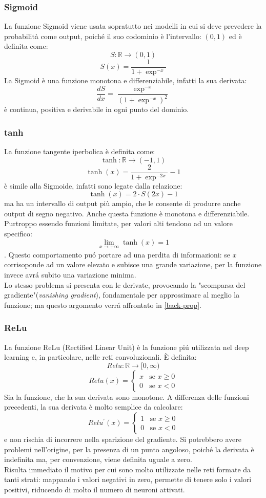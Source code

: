 \documentclass[a4paper,12pt]{report}
\begin{document}
\subsubsection{Sigmoid}
La funzione Sigmoid viene usata sopratutto nei modelli in cui si deve prevedere la probabilit\`{a} come output, poich\'{e} il suo codominio \`e l'intervallo: $(0,1)$ ed \`e definita come:
$$S:\mathbb{R}\longrightarrow(0,1)$$
$$S(x)=\frac{1}{1+\exp^{-x}}$$
La Sigmoid \`e una funzione monotona e differenziabile, infatti la sua derivata:
$$\frac{dS}{dx}=\frac{\exp^{-x}}{(1+\exp^{-x})^2}$$
\`e continua, positiva e derivabile in  ogni punto del dominio.
\newpage
\subsubsection{tanh}
La funzione tangente iperbolica \`e definita come: $$\tanh:\mathbb{R}\longrightarrow(-1,1)$$ 
$$ \tanh(x)=\frac{2}{1+\exp^{-2x}} - 1$$ 
\`e simile alla Sigmoide, infatti sono legate dalla relazione:
$$
\tanh(x)=2 \cdot S(2x)-1
$$
ma ha un intervallo di output pi\`{u} ampio, che le consente di produrre anche output di segno negativo. Anche questa funzione \`e monotona e differenziabile.\\
Purtroppo essendo funzioni limitate, per valori alti tendono ad un valore specifico: $$\lim_{x \to +\infty} \tanh(x)=1$$. Questo comportamento pu\'{o} portare ad una perdita di informazioni: se $x$ corrisoponde ad un valore elevato e subisce una grande variazione, per la funzione invece avr\'{a} subito una variazione minima.\\
Lo stesso problema si presenta con le derivate, provocando la "scomparsa del gradiente"(\textit{vanishing gradient}), fondamentale per approssimare al meglio la funzione; ma questo argomento verr\'{a} affrontato in \ref{back-prop}.
\subsubsection{ReLu}
La funzione ReLu (Rectified Linear Unit) \`e la funzione pi\'{u} utilizzata nel deep learning e, in particolare, nelle reti convoluzionali. \`{E} definita:
$$Relu:\mathbb{R}\longrightarrow [0,\infty)$$
$$
Relu(x)=
\left\{
\begin{array}{rl}
x & \mbox{se } x \geq 0 \\
0 & \mbox{se } x < 0
\end{array}
\right.
$$
Sia la funzione, che la sua derivata sono monotone. A differenza delle funzioni precedenti, la sua derivata \`e molto semplice da calcolare:
$$
Relu^{\prime}(x)=
\left\{
\begin{array}{rl}
1 & \mbox{se } x \geq 0 \\
0 & \mbox{se } x < 0
\end{array}
\right.
$$
e non rischia di incorrere nella sparizione del gradiente. Si potrebbero avere problemi nell'origine, per la presenza di un punto angoloso, poich\'{e} la derivata \`e indefinita ma, per convenzione, viene definita uguale a zero.\\
Risulta immediato il motivo per cui sono molto utilizzate nelle reti formate da tanti strati: mappando i valori negativi in zero, permette di tenere solo i valori positivi, riducendo di molto il numero di neuroni attivati.
\newpage
\end{document}
